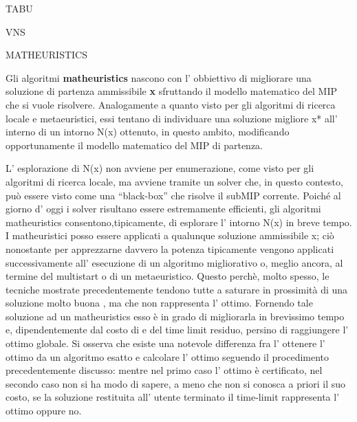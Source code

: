 \documentclass[11pt]{article}
\begin{document}
\vspace{2\baselineskip}
TABU
\vspace{2\baselineskip}

\vspace{2\baselineskip}
VNS
\vspace{2\baselineskip}

\vspace{2\baselineskip}
MATHEURISTICS
\vspace{2\baselineskip}

Gli algoritmi \textbf{matheuristics} nascono con l' obbiettivo di migliorare una soluzione di partenza ammissibile \textbf{x} sfruttando il modello matematico del MIP che si vuole risolvere. Analogamente a quanto visto per gli algoritmi di ricerca locale e metaeuristici, essi tentano di individuare una soluzione migliore x* all' interno di un intorno N(x) ottenuto, in questo ambito, modificando opportunamente il modello matematico del MIP di partenza. 

L' esplorazione di N(x) non avviene per enumerazione, come visto per gli algoritmi di ricerca locale, ma avviene tramite un solver che, in questo contesto, può essere visto come una “black-box” che risolve il subMIP corrente. Poiché al giorno d' oggi i solver risultano essere estremamente efficienti, gli algoritmi matheuristics consentono,tipicamente, di esplorare l' intorno N(x) in breve tempo. 
I matheuristici posso essere applicati a qualunque soluzione ammissibile x; ciò nonostante per apprezzarne davvero la potenza tipicamente vengono applicati successivamente all' esecuzione di un algoritmo migliorativo o, meglio ancora, al termine del multistart o di un metaeuristico. Questo perchè, molto spesso, le tecniche mostrate precedentemente tendono tutte a saturare in prossimità di una soluzione molto buona \textbf{}, ma che non rappresenta l' ottimo. Fornendo tale soluzione ad un matheuristics esso è in grado di migliorarla in brevissimo tempo e, dipendentemente dal costo di \textbf{} e del time limit residuo, persino di raggiungere l' ottimo globale. Si osserva che esiste una notevole differenza fra l' ottenere l' ottimo da un algoritmo esatto e calcolare l' ottimo seguendo il procedimento precedentemente discusso: mentre nel primo caso l' ottimo è certificato, nel secondo caso non si ha modo di sapere, a meno che non si conosca a priori il suo costo, se la soluzione restituita all' utente terminato il time-limit rappresenta l' ottimo oppure no.
\end{document}
